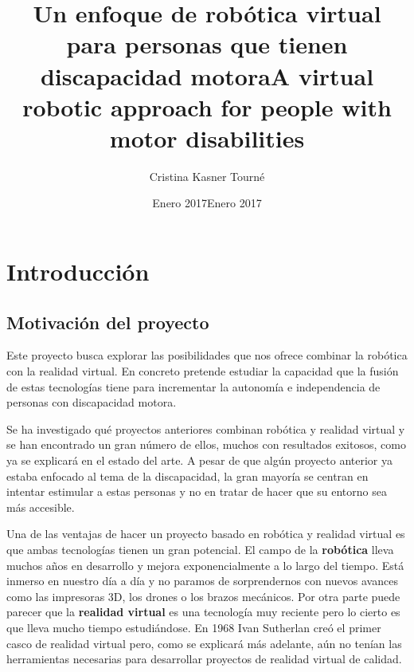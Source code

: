 \documentclass[twoside, 11pt]{epstfg}
\title[spa]{Un enfoque de robótica virtual para personas que tienen discapacidad motora}
\title[eng]{A virtual robotic approach for people with motor disabilities}
\author{Cristina Kasner Tourné}
\date[spa]{Enero 2017}
\date[eng]{Enero 2017}
\begin{document}

\frontmatter

\maketitle[spa]

\makeinnertitle[spa]

\makeabstract[spa]
\makeabstract[eng]

\tableofcontents
\clearpage
\listoftables
\clearpage
\listoffigures
\cleardoublepage

\printnoidxglossaries

\mainmatter
\chapter{Introducción} 


\section{Motivación del proyecto}

Este proyecto busca explorar las posibilidades que nos ofrece combinar la robótica con la realidad virtual. En concreto pretende estudiar la capacidad que la fusión de estas tecnologías tiene para incrementar la autonomía e independencia de personas con discapacidad motora.

Se ha investigado qué proyectos anteriores combinan robótica y realidad virtual y se han encontrado un gran número de ellos, muchos con resultados exitosos, como ya se explicará en el estado del arte. A pesar de que algún proyecto anterior ya estaba enfocado al tema de la discapacidad, la gran mayoría se centran en intentar estimular a estas personas y no en tratar de hacer que su entorno sea más accesible.

Una de las ventajas de hacer un proyecto basado en robótica y realidad virtual es que ambas tecnologías tienen un gran potencial.
El campo de la \textbf{robótica} lleva muchos años en desarrollo y mejora exponencialmente a lo largo del tiempo. Está inmerso en nuestro día a día y no paramos de sorprendernos con nuevos avances como las impresoras 3D, los drones o los brazos mecánicos.
Por otra parte puede parecer que la \textbf{realidad virtual} es una tecnología muy reciente pero lo cierto es que  lleva mucho tiempo estudiándose. En 1968 Ivan Sutherlan creó el primer casco de realidad virtual pero, como se explicará más adelante, aún no tenían las herramientas necesarias para desarrollar proyectos de realidad virtual de calidad.
\end{document}
